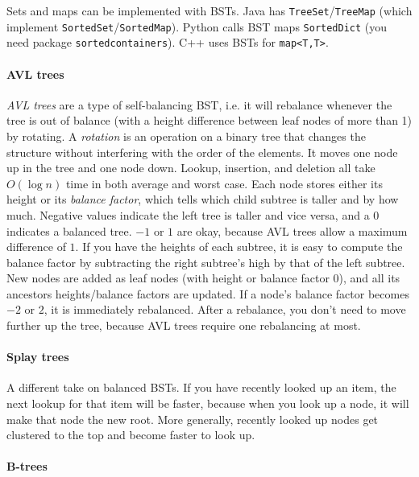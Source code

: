 \documentclass[table, xcdraw]{article}%
\begin{document}
Sets and maps can be implemented with BSTs. Java has \texttt{TreeSet}/\texttt{TreeMap} (which implement \texttt{SortedSet}/\texttt{SortedMap}). Python calls BST maps \texttt{SortedDict} (you need package \texttt{sortedcontainers}). C++ uses BSTs for \texttt{map<T,T>}. 

\paragraph{AVL trees}

\emph{AVL trees} are a type of self-balancing BST, i.e. it will rebalance whenever the tree is out of balance (with a height difference  between leaf nodes of more than 1) by rotating. A \emph{rotation} is an operation on a binary tree that changes the structure without interfering with the order of the elements. It moves one node up in the tree and one node down. Lookup, insertion, and deletion all take $O(\log n)$ time in both average and worst case. Each node stores either its height or its \emph{balance factor}, which tells which child subtree is taller and by how much. Negative values indicate the left tree is taller and vice versa, and a $0$ indicates a balanced tree. $-1$ or $1$ are okay, because AVL trees allow a maximum difference of $1$. If you have the heights of each subtree, it is easy to compute the balance factor by subtracting the right subtree's high by that of the left subtree. New nodes are added as leaf nodes (with height or balance factor $0$), and all its ancestors heights/balance factors are updated. If a node's balance factor becomes $-2$ or $2$, it is immediately rebalanced. After a rebalance, you don't need to move further up the tree, because AVL trees require one rebalancing at most.

\paragraph{Splay trees}

A different take on balanced BSTs. If you have recently looked up an item, the next lookup for that item will be faster, because when you look up a node, it will make that node the new root. More generally, recently looked up nodes get clustered to the top and become faster to look up.

\paragraph{B-trees}
\end{document}
